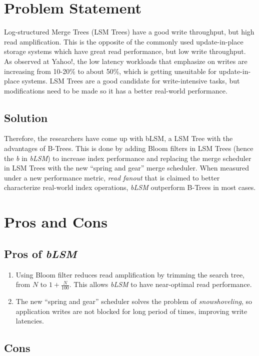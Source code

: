 \documentclass{article}
\title{\mytitle}
\author{\myname}
\date{\today}
\theoremstyle{plain}
\begin{document}
\maketitle
\section{Problem Statement}

Log-structured Merge Trees (LSM Trees) have a good write throughput, but high
read amplification. This is the opposite of the commonly used update-in-place
storage systems which have great read performance, but low write throughput. As
observed at Yahoo!, the low latency workloads that emphasize on writes are
increasing from 10-20\% to about 50\%, which is getting unsuitable for
update-in-place systems. LSM Trees are a good candidate for write-intensive
tasks, but modifications need to be made so it has a better real-world
performance.

\subsection{Solution}
Therefore, the researchers have come up with bLSM, a LSM Tree with the
advantages of B-Trees. This is done by adding Bloom filters in LSM Trees (hence
the \emph{b} in \emph{bLSM}) to increase index performance and replacing the
merge scheduler in LSM Trees with the new ``spring and gear'' merge scheduler.
When measured under a new performance metric, \emph{read fanout} that is claimed
to better characterize real-world index operations, \emph{bLSM} outperform
B-Trees in most cases.

\section{Pros and Cons}
\subsection{Pros of \emph{bLSM}}
\begin{enumerate}
\item Using Bloom filter reduces read amplification by trimming the search tree,
from $N$ to $1 + \frac{N}{100}$. This allows \emph{bLSM} to have near-optimal
read performance.
\item The new ``spring and gear'' scheduler solves the problem of
\emph{snowshoveling}, so application writes are not blocked for long period of
times, improving write latencies.
\end{enumerate}


\subsection{Cons}
\end{document}
